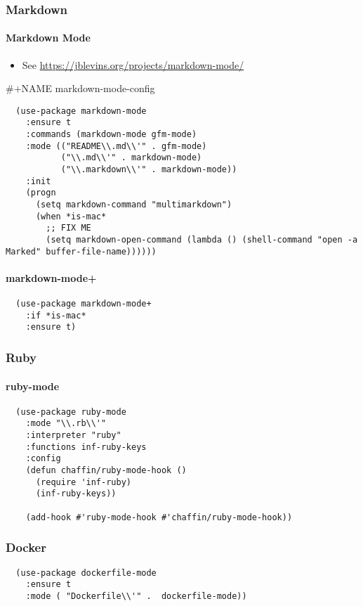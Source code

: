 \documentclass[11pt]{article}
\begin{document}
\subsubsection*{Markdown}
\label{sec:orgeabe2a4}
\paragraph*{Markdown Mode}
\label{sec:org7f3fd67}

\begin{itemize}
\item See \url{https://jblevins.org/projects/markdown-mode/}
\end{itemize}

\#+NAME markdown-mode-config
\begin{verbatim}
  (use-package markdown-mode
    :ensure t
    :commands (markdown-mode gfm-mode)
    :mode (("README\\.md\\'" . gfm-mode)
           ("\\.md\\'" . markdown-mode)
           ("\\.markdown\\'" . markdown-mode))
    :init
    (progn
      (setq markdown-command "multimarkdown")
      (when *is-mac*
        ;; FIX ME
        (setq markdown-open-command (lambda () (shell-command "open -a Marked" buffer-file-name))))))
\end{verbatim}

\paragraph*{markdown-mode+}
\label{sec:org3ce1866}

\begin{verbatim}
  (use-package markdown-mode+
    :if *is-mac*
    :ensure t)
\end{verbatim}
\subsubsection*{Ruby}
\label{sec:org9fe9e03}
\paragraph*{ruby-mode}
\label{sec:org6042ed3}

\begin{verbatim}
  (use-package ruby-mode
    :mode "\\.rb\\'"
    :interpreter "ruby"
    :functions inf-ruby-keys
    :config
    (defun chaffin/ruby-mode-hook ()
      (require 'inf-ruby)
      (inf-ruby-keys))

    (add-hook #'ruby-mode-hook #'chaffin/ruby-mode-hook))
\end{verbatim}
\subsubsection*{Docker}
\label{sec:org57159f7}

\begin{verbatim}
  (use-package dockerfile-mode
    :ensure t
    :mode ( "Dockerfile\\'" .  dockerfile-mode))
\end{verbatim}
\end{document}
